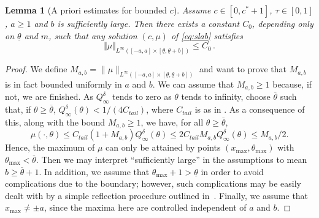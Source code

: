 \documentclass[11pt]{article}    %
\newtheorem{lemma}[theorem]{Lemma}
\begin{document}
\begin{lemma}[A priori estimates for bounded $c$]\label{lem:nc}
Assume $c \in \left[ 0 , c^* + 1 \right]$, $\tau \in [0,1]$, $a\geq 1$ and $b$ is sufficiently large.
 Then there exists a constant $C_0$, depending only on $\underline\theta$ and $m$, such that any solution $(c,\mu)$ of \eqref{eq:slab} satisfies
\begin{equation*}
\Vert \mu \Vert_{L^\infty\left( [-a,a]\times[\underline\theta,\underline\theta+b] \right) }\leq C_0\,.
\end{equation*}
\end{lemma}

\begin{proof}%
We define $M_{a,b} = \|\mu\|_{L^\infty([-a,a]\times[\underline\theta, \underline\theta + b])}$ and want to prove that $M_{a,b}$ is in fact bounded uniformly in $a$ and $b$.  We can assume that $M_{a,b} \geq 1$ because, if not, we are finished.  As $Q_\infty^\delta$ tends to zero as $\theta$ tends to infinity, choose $\overline \theta$ such that, if $\theta \geq \overline\theta$, $Q_\infty^\delta(\theta) < 1/(4C_{tail})$, where $C_{tail}$ is as in .  As a consequence of this, along with the bound $M_{a,b} \geq 1$, we have, for all $\theta \geq \overline \theta$,
\[
	\mu(\cdot, \theta) \leq C_{tail}(1 + M_{a,b}) Q_\infty^\delta(\theta)
		\leq 2C_{tail} M_{a,b} Q_\infty^\delta(\theta)
		\leq M_{a,b}/2.
\]
Hence, the maximum of $\mu$ can only be attained by points $(x_{\max},\theta_{\max})$ with $\theta_{\max} < \overline \theta$.  Then we may interpret ``sufficiently large'' in the assumptions to mean $b \geq \overline \theta + 1$.  In addition, we assume that $\theta_{\max} + 1 > \underline\theta$ in order to avoid complications due to the boundary; however, such complications may be easily dealt with by a simple reflection procedure outlined in~\cite{BerestyckiMouhotRaoul,Turanova}.  Finally, we assume that $x_{\max} \neq \pm a$, since the maxima here are controlled independent of $a$ and $b$. %


\end{proof}
\end{document}
